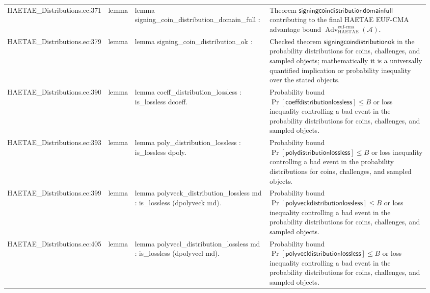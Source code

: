 \documentclass[10pt]{article}
\newcommand{\Adv}{\operatorname{Adv}}
\begin{document}
\begin{longtable}{L{0.11\textwidth}L{0.055\textwidth}L{0.385\textwidth}L{0.41\textwidth}}
HAETAE\_\allowbreak{}Distributions.\allowbreak{}ec:\allowbreak{}371 & lemma & {\ttfamily\scriptsize lemma signing\_\allowbreak{}coin\_\allowbreak{}distribution\_\allowbreak{}domain\_\allowbreak{}full :} & Theorem $\mathsf{signingcoindistributiondomainfull}$ contributing to the final HAETAE EUF-CMA advantage bound $\Adv_{\mathrm{HAETAE}}^{\mathrm{euf\mbox{-}cma}}(\mathcal A)$. \\
HAETAE\_\allowbreak{}Distributions.\allowbreak{}ec:\allowbreak{}379 & lemma & {\ttfamily\scriptsize lemma signing\_\allowbreak{}coin\_\allowbreak{}distribution\_\allowbreak{}ok :} & Checked theorem $\mathsf{signingcoindistributionok}$ in the probability distributions for coins, challenges, and sampled objects; mathematically it is a universally quantified implication or probability inequality over the stated objects. \\
HAETAE\_\allowbreak{}Distributions.\allowbreak{}ec:\allowbreak{}390 & lemma & {\ttfamily\scriptsize lemma coeff\_\allowbreak{}distribution\_\allowbreak{}lossless : is\_\allowbreak{}lossless dcoeff.} & Probability bound $\Pr[\mathsf{coeffdistributionlossless}]\le B$ or loss inequality controlling a bad event in the probability distributions for coins, challenges, and sampled objects. \\
HAETAE\_\allowbreak{}Distributions.\allowbreak{}ec:\allowbreak{}393 & lemma & {\ttfamily\scriptsize lemma poly\_\allowbreak{}distribution\_\allowbreak{}lossless : is\_\allowbreak{}lossless dpoly.} & Probability bound $\Pr[\mathsf{polydistributionlossless}]\le B$ or loss inequality controlling a bad event in the probability distributions for coins, challenges, and sampled objects. \\
HAETAE\_\allowbreak{}Distributions.\allowbreak{}ec:\allowbreak{}399 & lemma & {\ttfamily\scriptsize lemma polyveck\_\allowbreak{}distribution\_\allowbreak{}lossless md : is\_\allowbreak{}lossless (dpolyveck md).} & Probability bound $\Pr[\mathsf{polyveckdistributionlossless}]\le B$ or loss inequality controlling a bad event in the probability distributions for coins, challenges, and sampled objects. \\
HAETAE\_\allowbreak{}Distributions.\allowbreak{}ec:\allowbreak{}405 & lemma & {\ttfamily\scriptsize lemma polyvecl\_\allowbreak{}distribution\_\allowbreak{}lossless md : is\_\allowbreak{}lossless (dpolyvecl md).} & Probability bound $\Pr[\mathsf{polyvecldistributionlossless}]\le B$ or loss inequality controlling a bad event in the probability distributions for coins, challenges, and sampled objects. \\

\end{longtable}
\end{document}
